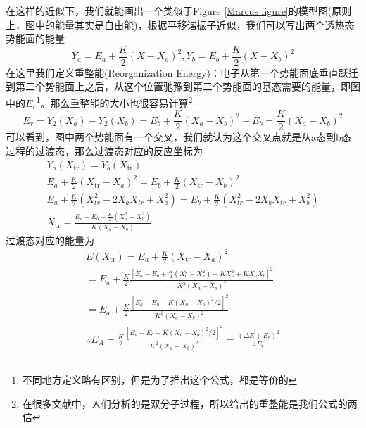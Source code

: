 \documentclass[12pt,a4paper,openany,twoside]{book}
\numberwithin{equation}{section}
\begin{document}
        在这样的近似下，我们就能画出一个类似于Figure \ref{Marcus figure}的模型图(原则上，图中的能量其实是自由能)，根据平移谐振子近似，我们可以写出两个透热态势能面的能量
        \begin{equation*}
          Y_{a}=E_{a}+\frac{K}{2}\left(X-X_{a}\right)^{2}, Y_{b}=E_{b}+\frac{K}{2}\left(X-X_{b}\right)^{2}
        \end{equation*}
        在这里我们定义重整能(Reorganization Energy)：电子从第一个势能面底垂直跃迁到第二个势能面上之后，从这个位置驰豫到第二个势能面的基态需要的能量，即图中的$E_r$\footnote{不同地方定义略有区别，但是为了推出这个公式，都是等价的}。那么重整能的大小也很容易计算\footnote{在很多文献中，人们分析的是双分子过程，所以给出的重整能是我们公式的两倍}
        \begin{equation*}
          E_{r}=Y_{2}\left(X_{a}\right)-Y_{2}\left(X_{b}\right)=E_{b}+\frac{K}{2}\left(X_{a}-X_{b}\right)^{2}-E_{b}=\frac{K}{2}\left(X_{a}-X_{b}\right)^{2}
        \end{equation*}
        可以看到，图中两个势能面有一个交叉，我们就认为这个交叉点就是从a态到b态过程的过渡态，那么过渡态对应的反应坐标为
        \begin{equation*}
          \begin{array}{c}
            {Y_{a}\left(X_{\mathrm{tr}}\right)=Y_{b}\left(X_{\mathrm{tr}}\right)} \\
            {E_{a}+\frac{K}{2}\left(X_{\mathrm{tr}}-X_{a}\right)^{2}=E_{b}+\frac{K}{2}\left(X_{\mathrm{tr}}-X_{b}\right)^{2}} \\
            {E_{a}+\frac{K}{2}\left(X_{tr}^{2}-2 X_{a} X_{tr}+X_{a}^{2}\right)=E_{b}+\frac{K}{2}\left(X_{tr}^{2}-2 X_{b} X_{tr}+X_{b}^{2}\right)} \\
            {X_{\mathrm{tr}}=\frac{E_{a}-E_{b}+\frac{K}{2}\left(X_{a}^{2}-X_{b}^{2}\right)}{K\left(X_{a}-X_{b}\right)}}
          \end{array}
        \end{equation*}
        过渡态对应的能量为
        \begin{equation*}
          \begin{array}{l}
            {E\left(X_{\mathrm{tr}}\right)=E_{a}+\frac{K}{2}\left(X_{\mathrm{tr}}-X_{a}\right)^{2}} \\
            {=E_{a}+\frac{K}{2} \frac{\left[E_{a}-E_{b}+\frac{K}{2}\left(X_{a}^{2}-X_{b}^{2}\right)-K X_{a}^{2}+K X_{a} X_{b}\right]^{2}}{K^{2}\left(X_{a}-X_{b}\right)^{2}}} \\
            {=E_{a}+\frac{K}{2} \frac{\left[E_{a}-E_{b}-K\left(X_{a}-X_{b}\right)^{2} / 2\right]^{2}}{K^{2}\left(X_{a}-X_{b}\right)^{2}}} \\
            {\therefore E_{A}=\frac{K}{2} \frac{\left[E_{a}-E_{b}-K\left(X_{a}-X_{b}\right)^{2} / 2\right]^{2}}{K^{2}\left(X_{a}-X_{b}\right)^{2}}=\frac{\left(\Delta E+E_{r}\right)^{2}}{4 E_{r}}}
          \end{array}
        \end{equation*}
\end{document}
